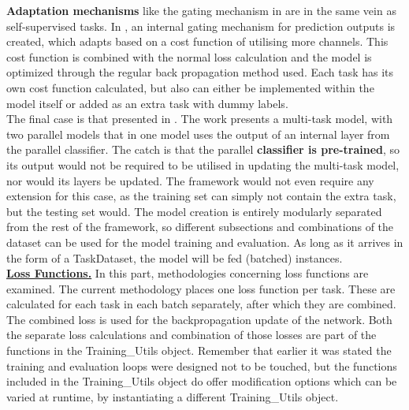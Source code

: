 \textbf{Adaptation mechanisms} like the gating mechanism in \cite{tagliasacchi2020multi} are in the same vein as self-supervised tasks. In \cite{tagliasacchi2020multi}, an internal gating mechanism for prediction outputs is created, which adapts based on a cost function of utilising more channels. This cost function is combined with the normal loss calculation and the model is optimized through the regular back propagation method used. Each task has its own cost function calculated, but also can either be implemented within the model itself or added as an extra task with dummy labels.\\

The final case is that presented in \cite{wu2020domain}. The work presents a multi-task model, with two parallel models that in one model uses the output of an internal layer from the parallel classifier. The catch is that the parallel \textbf{classifier is pre-trained}, so its output would not be required to be utilised in updating the multi-task model, nor would its layers be updated. The framework would not even require any extension for this case, as the training set can simply not contain the extra task, but the testing set would. The model creation is entirely modularly separated from the rest of the framework, so different subsections and combinations of the dataset can be used for the model training and evaluation. As long as it arrives in the form of a TaskDataset, the model will be fed (batched) instances.\\


\underline{\textbf{Loss Functions.}} In this part, methodologies concerning loss functions are examined. The current methodology places one loss function per task. These are calculated for each task in each batch separately, after which they are combined. The combined loss is used for the backpropagation update of the network. Both the separate loss calculations and combination of those losses are part of the functions in the Training\_Utils object. Remember that earlier it was stated the training and evaluation loops were designed not to be touched, but the functions included in the Training\_Utils object do offer modification options which can be varied at runtime, by instantiating a different Training\_Utils object. \\

